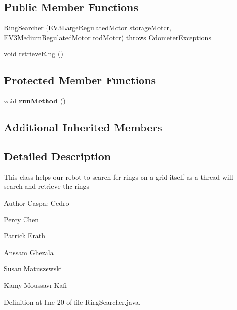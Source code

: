 \subsection*{Public Member Functions}
\begin{DoxyCompactItemize}
\item 
\hyperlink{classca_1_1mcgill_1_1ecse211_1_1threads_1_1_ring_searcher_a58fdaba16c2b961446d1474b76e66e49}{Ring\+Searcher} (E\+V3\+Large\+Regulated\+Motor storage\+Motor, E\+V3\+Medium\+Regulated\+Motor rod\+Motor)  throws Odometer\+Exceptions 
\item 
void \hyperlink{classca_1_1mcgill_1_1ecse211_1_1threads_1_1_ring_searcher_abd7a2651a7c5de76a018664c8bf327af}{retrieve\+Ring} ()
\end{DoxyCompactItemize}
\subsection*{Protected Member Functions}
\begin{DoxyCompactItemize}
\item 
\mbox{\label{classca_1_1mcgill_1_1ecse211_1_1threads_1_1_ring_searcher_a2b03c700b5d232f5aef7c6acf439b7ea}} 
void {\bfseries run\+Method} ()
\end{DoxyCompactItemize}
\subsection*{Additional Inherited Members}


\subsection{Detailed Description}
This class helps our robot to search for rings on a grid itself as a thread will search and retrieve the rings

\begin{DoxyAuthor}{Author}
Caspar Cedro 

Percy Chen 

Patrick Erath 

Anssam Ghezala 

Susan Matuszewski 

Kamy Moussavi Kafi 
\end{DoxyAuthor}


Definition at line 20 of file Ring\+Searcher.\+java.



